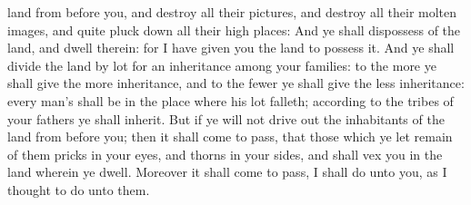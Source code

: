 {land from
before you, and
destroy all their
pictures, and
destroy all their
molten
images, and quite pluck
down all their high
places:
And ye shall
dispossess
{} of the
land, and
dwell therein: for I have
given you the
land to
possess it.
And ye shall
divide the
land by
lot for an
inheritance among your
families:
{} to the
more ye shall give the
more
inheritance, and to the
fewer ye shall give the
less
inheritance: every man’s
{} shall be in the place where his
lot
falleth; according to the
tribes of your
fathers ye shall
inherit.
But if ye will not drive
out the
inhabitants of the
land from
before you; then it shall come to pass, that those which ye let
remain of them
{}
pricks in your
eyes, and
thorns in your
sides, and shall
vex you in the
land wherein ye
dwell.
Moreover it shall come to pass,
{} I shall
do unto you, as I
thought to
do unto them.

}
